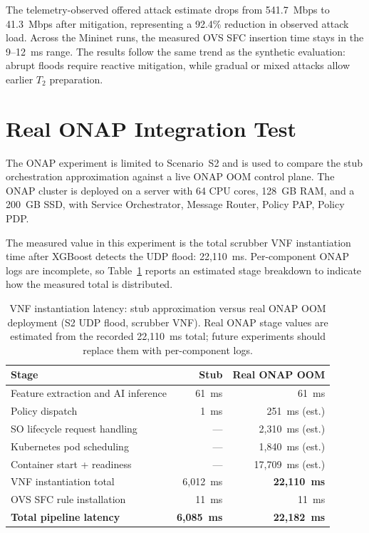 \documentclass[12pt, a4paper, reqno, oneside]{book}
\newcommand{\tier}[1]{$T_{#1}$}
\begin{document}
The telemetry-observed offered attack estimate drops from 541.7~Mbps to 41.3~Mbps after mitigation, representing a 92.4\% reduction in observed attack load. Across the Mininet runs, the measured OVS SFC insertion time stays in the 9--12~ms range. The results follow the same trend as the synthetic evaluation: abrupt floods require reactive mitigation, while gradual or mixed attacks allow earlier \tier{2} preparation.

\section{Real ONAP Integration Test}
\label{sec:onap-real}

The ONAP experiment is limited to Scenario~S2 and is used to compare the stub orchestration approximation against a live ONAP OOM control plane. The ONAP cluster is deployed on a server with 64 CPU cores, 128~GB RAM, and a 200~GB SSD, with Service Orchestrator, Message Router, Policy PAP, Policy PDP.

The measured value in this experiment is the total scrubber VNF instantiation time after XGBoost detects the UDP flood: 22{,}110~ms. Per-component ONAP logs are incomplete, so Table~\ref{tab:onap-real-vs-stub} reports an estimated stage breakdown to indicate how the measured total is distributed.

\begin{table}[H]
\centering
\small
\caption{VNF instantiation latency: stub approximation versus real
ONAP OOM deployment (S2 UDP flood, scrubber VNF). Real ONAP stage values are estimated from the recorded 22{,}110~ms total; future experiments should replace them with per-component logs.}
\label{tab:onap-real-vs-stub}
\begin{tabular}{@{}lrr@{}}
\toprule
Stage & Stub & Real ONAP OOM \\
\midrule
Feature extraction and AI inference & 61~ms   & 61~ms \\
Policy dispatch      & 1~ms    & 251~ms (est.) \\
SO lifecycle request handling       & ---     & 2{,}310~ms (est.) \\
Kubernetes pod scheduling           & ---     & 1{,}840~ms (est.) \\
Container start + readiness         & ---     & 17{,}709~ms (est.) \\
VNF instantiation total             & 6{,}012~ms & \textbf{22{,}110~ms} \\
OVS SFC rule installation           & 11~ms   & 11~ms \\
\midrule
\textbf{Total pipeline latency}     & \textbf{6{,}085~ms} & \textbf{22{,}182~ms} \\
\bottomrule
\end{tabular}
\end{table}
\end{document}
